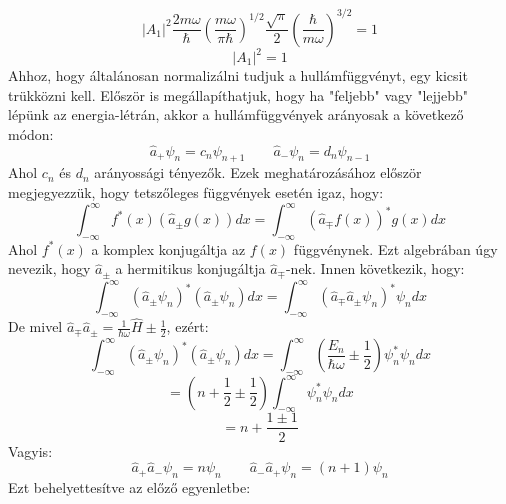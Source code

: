 \documentclass[../main.tex]{subfiles}
\begin{document}
\begin{equation}
    |A_1|^2 \frac{2 m \omega}{\hbar} \left( \frac{m \omega}{\pi \hbar} \right)^{1/2} \frac{\sqrt{\pi}}{2} \left( \frac{\hbar}{m \omega} \right)^{3/2} = 1
\end{equation}
\begin{equation}
    |A_1|^2 = 1
\end{equation}
Ahhoz, hogy általánosan normalizálni tudjuk a hullámfüggvényt, egy kicsit trükközni kell. Először is megállapíthatjuk, hogy
ha "feljebb" vagy "lejjebb" lépünk az  energia-létrán, akkor a hullámfüggvények arányosak a következő módon:
\begin{equation}
    \hat{a}_+\psi_{n} = c_n \psi_{n+1} \quad \quad \hat{a}_- \psi_{n} = d_n \psi_{n-1}
\end{equation}
Ahol $c_n$ és $d_n$ arányossági tényezők. Ezek meghatározásához először megjegyezzük, hogy tetszőleges függvények esetén igaz, hogy:
\begin{equation}
    \int_{-\infty}^{\infty} f^*(x) (\hat{a}_\pm g(x)) dx = \int_{-\infty}^{\infty} (\hat{a}_\mp f(x))^* g(x) dx
\end{equation}
Ahol $f^*(x)$ a komplex konjugáltja az $f(x)$ függvénynek. Ezt algebrában úgy nevezik, hogy $\hat{a}_\pm$ a hermitikus konjugáltja $\hat{a}_\mp$-nek.
Innen következik, hogy:
\begin{equation}
    \int_{-\infty}^{\infty} (\hat{a}_\pm \psi_n)^* (\hat{a}_\pm \psi_n) dx = \int_{-\infty}^{\infty} (\hat{a}_\mp \hat{a}_\pm \psi_n)^* \psi_n dx
\end{equation}
De mivel $\hat{a}_\mp \hat{a}_\pm = \frac{1}{\hbar \omega} \hat{H} \pm \frac{1}{2}$, ezért:
\begin{equation}
    \int_{-\infty}^{\infty} (\hat{a}_\pm \psi_n)^* (\hat{a}_\pm \psi_n) dx = \int_{-\infty}^{\infty} \left( \frac{E_n}{\hbar \omega} \pm \frac{1}{2} \right) \psi_n^* \psi_n dx
\end{equation}
\begin{equation}
    = \left( n + \frac{1}{2} \pm \frac{1}{2} \right) \int_{-\infty}^{\infty} \psi_n^* \psi_n dx
\end{equation}
\begin{equation}
    = n + \frac{1 \pm 1}{2}
\end{equation}
Vagyis:
\begin{equation}
    \hat{a}_+ \hat{a}_- \psi_n = n \psi_n \quad \quad \hat{a}_- \hat{a}_+ \psi_n = (n + 1) \psi_n
\end{equation}
Ezt behelyettesítve az előző egyenletbe:
\end{document}

